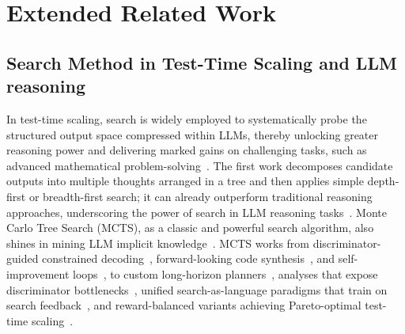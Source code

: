 \documentclass{article} %
\theoremstyle{definition}
\theoremstyle{remark}
\begin{document}










\section{Extended Related Work}
\subsection{Search Method in Test-Time Scaling and LLM reasoning}
In test-time scaling, search is widely employed to systematically probe the structured output space compressed within LLMs, thereby unlocking greater reasoning power and delivering marked gains on challenging tasks, such as advanced mathematical problem-solving~\citep{zhang2025survey, li2025system}. The first work decomposes candidate outputs into multiple thoughts arranged in a tree and then applies simple depth-first or breadth-first search; it can already outperform traditional reasoning approaches, underscoring the power of search in LLM reasoning tasks~\citep{yao2023tree}. Monte Carlo Tree Search (MCTS), as a classic and powerful search algorithm, also shines in mining LLM implicit knowledge~\citep{swiechowski2023monte}. MCTS works from discriminator-guided constrained decoding~\citep{chaffin-etal-2022-ppl}, forward-looking code synthesis~\citep{zhang2023planning}, and self-improvement loops~\citep{tian2024toward}, to custom long-horizon planners~\citep{wan2024alphazerolike}, analyses that expose discriminator bottlenecks~\citep{chen-etal-2024-tree}, unified search-as-language paradigms that train on search feedback~\citep{gandhistream}, and reward-balanced variants achieving Pareto-optimal test-time scaling~\citep{wu2025inference}.
\end{document}
